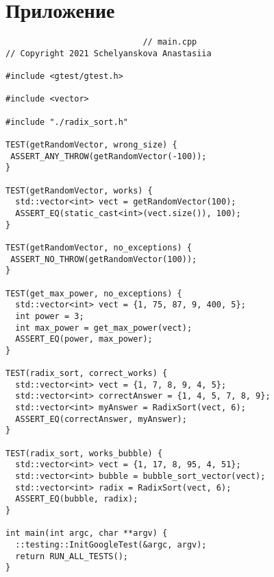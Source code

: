 \documentclass{report}
\begin{document}
\section*{Приложение}
\begin{lstlisting}
							// main.cpp
// Copyright 2021 Schelyanskova Anastasiia

#include <gtest/gtest.h>

#include <vector>

#include "./radix_sort.h"

TEST(getRandomVector, wrong_size) {
 ASSERT_ANY_THROW(getRandomVector(-100)); 
}

TEST(getRandomVector, works) {
  std::vector<int> vect = getRandomVector(100);
  ASSERT_EQ(static_cast<int>(vect.size()), 100);
}

TEST(getRandomVector, no_exceptions) {
 ASSERT_NO_THROW(getRandomVector(100)); 
}

TEST(get_max_power, no_exceptions) {
  std::vector<int> vect = {1, 75, 87, 9, 400, 5};
  int power = 3;
  int max_power = get_max_power(vect);
  ASSERT_EQ(power, max_power);
}

TEST(radix_sort, correct_works) {
  std::vector<int> vect = {1, 7, 8, 9, 4, 5};
  std::vector<int> correctAnswer = {1, 4, 5, 7, 8, 9};
  std::vector<int> myAnswer = RadixSort(vect, 6);
  ASSERT_EQ(correctAnswer, myAnswer);
}

TEST(radix_sort, works_bubble) {
  std::vector<int> vect = {1, 17, 8, 95, 4, 51};
  std::vector<int> bubble = bubble_sort_vector(vect);
  std::vector<int> radix = RadixSort(vect, 6);
  ASSERT_EQ(bubble, radix);
}

int main(int argc, char **argv) {
  ::testing::InitGoogleTest(&argc, argv);
  return RUN_ALL_TESTS();
}

\end{lstlisting}
\end{document}
